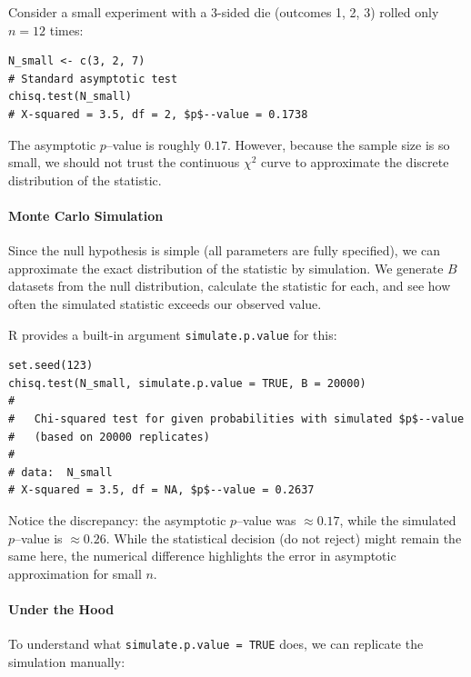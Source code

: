 Consider a small experiment with a 3-sided die (outcomes 1, 2, 3) rolled only $n=12$ times:

\begin{verbatim}
N_small <- c(3, 2, 7)
# Standard asymptotic test
chisq.test(N_small)
# X-squared = 3.5, df = 2, $p$--value = 0.1738
\end{verbatim}

The asymptotic $p$--value is roughly $0.17$. However, because the sample size is so small, we should not trust the continuous $\chi^2$ curve to approximate the discrete distribution of the statistic.

\paragraph{Monte Carlo Simulation}
Since the null hypothesis is simple (all parameters are fully specified), we can approximate the exact distribution of the statistic by simulation. We generate $B$ datasets from the null distribution, calculate the statistic for each, and see how often the simulated statistic exceeds our observed value.

R provides a built-in argument \texttt{simulate.p.value} for this:

\begin{verbatim}
set.seed(123)
chisq.test(N_small, simulate.p.value = TRUE, B = 20000)
# 
# 	Chi-squared test for given probabilities with simulated $p$--value
# 	(based on 20000 replicates)
# 
# data:  N_small
# X-squared = 3.5, df = NA, $p$--value = 0.2637
\end{verbatim}



Notice the discrepancy: the asymptotic $p$--value was $\approx 0.17$, while the simulated $p$--value is $\approx 0.26$. While the statistical decision (do not reject) might remain the same here, the numerical difference highlights the error in asymptotic approximation for small $n$.

\paragraph{Under the Hood}
To understand what \texttt{simulate.p.value = TRUE} does, we can replicate the simulation manually:

